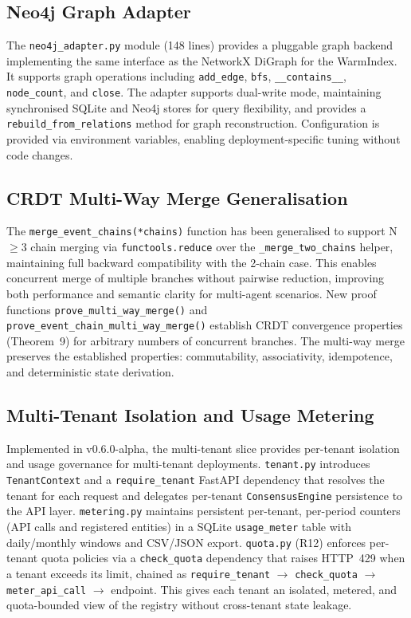 \subsection{Neo4j Graph Adapter}\label{app:neo4j}

The \texttt{neo4j\_adapter.py} module (148 lines) provides a pluggable graph backend implementing the same interface as the NetworkX DiGraph for the WarmIndex. It supports graph operations including \texttt{add\_edge}, \texttt{bfs}, \texttt{\_\_contains\_\_}, \texttt{node\_count}, and \texttt{close}. The adapter supports dual-write mode, maintaining synchronised SQLite and Neo4j stores for query flexibility, and provides a \texttt{rebuild\_from\_relations} method for graph reconstruction. Configuration is provided via environment variables, enabling deployment-specific tuning without code changes.

\subsection{CRDT Multi-Way Merge Generalisation}\label{app:crdt-multiway}

The \texttt{merge\_event\_chains(*chains)} function has been generalised to support N$\geq$3 chain merging via \texttt{functools.reduce} over the \texttt{\_merge\_two\_chains} helper, maintaining full backward compatibility with the 2-chain case. This enables concurrent merge of multiple branches without pairwise reduction, improving both performance and semantic clarity for multi-agent scenarios. New proof functions \texttt{prove\_multi\_way\_merge()} and \texttt{prove\_event\_chain\_multi\_way\_merge()} establish CRDT convergence properties (Theorem~9) for arbitrary numbers of concurrent branches. The multi-way merge preserves the established properties: commutability, associativity, idempotence, and deterministic state derivation.

\subsection{Multi-Tenant Isolation and Usage Metering}\label{app:multi-tenant}

Implemented in v0.6.0-alpha, the multi-tenant slice provides per-tenant isolation and usage governance for multi-tenant deployments. \texttt{tenant.py} introduces \texttt{TenantContext} and a \texttt{require\_tenant} FastAPI dependency that resolves the tenant for each request and delegates per-tenant \texttt{ConsensusEngine} persistence to the API layer. \texttt{metering.py} maintains persistent per-tenant, per-period counters (API calls and registered entities) in a SQLite \texttt{usage\_meter} table with daily/monthly windows and CSV/JSON export. \texttt{quota.py} (R12) enforces per-tenant quota policies via a \texttt{check\_quota} dependency that raises HTTP~429 when a tenant exceeds its limit, chained as \texttt{require\_tenant} $\to$ \texttt{check\_quota} $\to$ \texttt{meter\_api\_call} $\to$ endpoint. This gives each tenant an isolated, metered, and quota-bounded view of the registry without cross-tenant state leakage.


